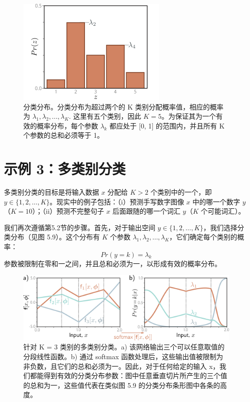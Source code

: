 \begin{figure}[ht!]
	\centering
	\includegraphics[width=0.7\linewidth]{png/chapter5/LossCategorical.png}
	\caption{分类分布。分类分布为超过两个的 K 类别分配概率值，相应的概率为 \(\lambda_1,\lambda_2,...,\lambda_K\). 这里有五个类别，因此 \(K = 5\)。为保证其为一个有效的概率分布，每个参数 \(\lambda_k\) 都应处于 [0, 1] 的范围内，并且所有 K 个参数的总和必须等于 1。}
\end{figure}


\section{示例 3：多类别分类}

多类别分类的目标是将输入数据 \(x\) 分配给 \(K > 2\) 个类别中的一个，即 \(y \in \{1, 2, \ldots, K\}\)。现实中的例子包括：（i）预测手写数字图像 \(x\) 中的哪一个数字 \(y\)（\(K = 10\)）；（ii）预测不完整句子 \(x\) 后面跟随的哪一个词汇 \(y\)（\(K\) 个可能词汇）。

我们再次遵循第5.2节的步骤。首先，对于输出空间 \(y \in \{1, 2, \ldots, K\}\)，我们选择分类分布（见图 5.9）。这个分布有 \(K\) 个参数 \(\lambda_1, \lambda_2, \ldots, \lambda_K\)，它们确定每个类别的概率：
\begin{equation}
Pr(y = k) = \lambda_k 
\end{equation}
参数被限制在零和一之间，并且总和必须为一，以形成有效的概率分布。

\begin{figure}[ht!]
	\centering
	\includegraphics[width=0.7\linewidth]{png/chapter5/LossMultiClassClassification.png}
	\caption{针对 K = 3 类别的多类别分类。a) 该网络输出三个可以任意取值的分段线性函数。b) 通过 softmax 函数处理后，这些输出值被限制为非负数，且它们的总和必须为一。因此，对于任何给定的输入 x，我们都能得到有效的分类分布参数：图中任意垂直切片所产生的三个值的总和为一，这些值代表在类似图 5.9 的分类分布条形图中各条的高度。}
\end{figure}


